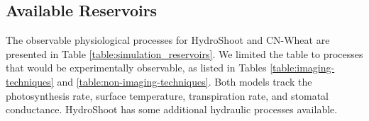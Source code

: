 % 

\subsection{Available Reservoirs}

The observable physiological processes for HydroShoot and CN-Wheat are presented in Table \ref{table:simulation_reservoirs}.
We limited the table to processes that would be experimentally observable, as listed in Tables \ref{table:imaging-techniques} and \ref{table:non-imaging-techniques}. 
Both models track the photosynthesis rate, surface temperature, transpiration rate, and stomatal conductance. 
HydroShoot has some additional hydraulic processes available.

% 